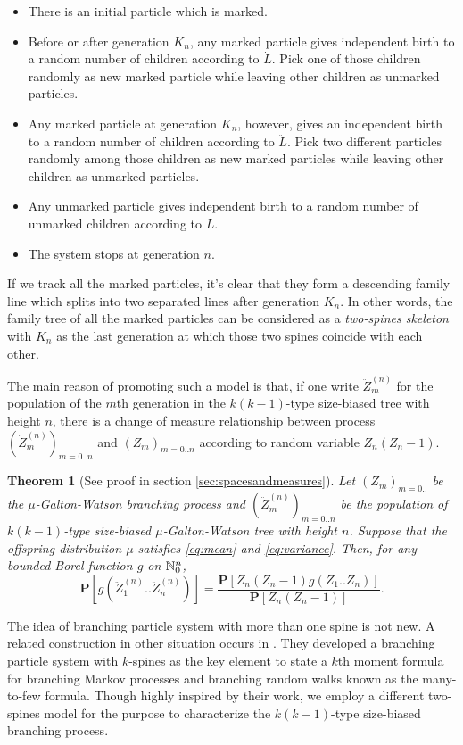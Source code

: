 \documentclass[12pt]{amsart}
\newtheorem{thm}{Theorem}[section]
\theoremstyle{remark}
\numberwithin{equation}{section}
\newcommand{\defn}[1]{{\em #1}}
\newcommand{\prob}{\mathbf P}
\newcommand{\expr}[1]{\left( #1 \right)}
\newcommand{\brac}[1]{\left[ #1 \right]}
\begin{document}
\begin{itemize}
\item 
	There is an initial particle which is marked.
\item 
	Before or after generation $K_n$, any marked particle gives independent birth to a random number of children according to $\dot L$. Pick one of those children randomly as new marked particle while leaving other children as unmarked particles.
\item 
	Any marked particle at generation $K_n$, however, gives an independent birth to a random number of children according to $\ddot L$. Pick two different particles randomly among those children as new marked particles while leaving other children as unmarked particles.
\item 
	Any unmarked particle gives independent birth to a random number of unmarked children according to $L$.
\item 
	The system stops at generation $n$.
\end{itemize}
\par
	If we track all the marked particles, it's clear that they form a descending family line which splits into two separated lines after generation $K_n$. In other words, the family tree of all the marked particles can be considered as a \defn{two-spines skeleton} with $K_n$ as the last generation at which those two spines coincide with each other.
\par	
	The main reason of promoting such a model is that, if one write $\ddot Z_m^{(n)}$ for the population of the $m$th generation in the $k(k-1)$-type size-biased tree with height $n$, there is a change of measure relationship between process $(\ddot Z_m^{(n)})_{m=0..n}$ and $(Z_m)_{m=0..n}$ according to random variable $Z_n(Z_n-1)$.
\begin{thm}[See proof in section \ref{sec:spacesandmeasures}]
\label{thm:changeofmeasure}
	Let $(Z_m)_{m=0..}$ be the $\mu$-Galton-Watson branching process and $(\ddot Z_m^{(n)})_{m=0..n}$ be the population of $k(k-1)$-type size-biased $\mu$-Galton-Watson tree with height $n$. Suppose that the offspring distribution $\mu$ satisfies \eqref{eq:mean} and \eqref{eq:variance}. Then, for any bounded Borel function $g$ on $\mathbb N^{n}_0$,
\begin{equation*}
		\prob\brac{g\expr{\ddot Z_1^{(n)}..\ddot Z_n^{(n)}}}
	=
		\frac{\prob\brac{Z_n(Z_n-1) g\expr{Z_1..Z_n}}}{\prob\brac{Z_n(Z_n-1)}}.
\end{equation*}
\end{thm}
\par
	The idea of branching particle system with more than one spine is not new. A related construction in  other situation occurs in \citet*{harris2015many}. They developed a branching particle system with $k$-spines as the key element to state a $k$th moment formula for branching Markov processes and branching random walks known as the many-to-few formula. Though highly inspired by their work, we employ a different two-spines model for the purpose to characterize the $k(k-1)$-type size-biased branching process.
\end{document}
